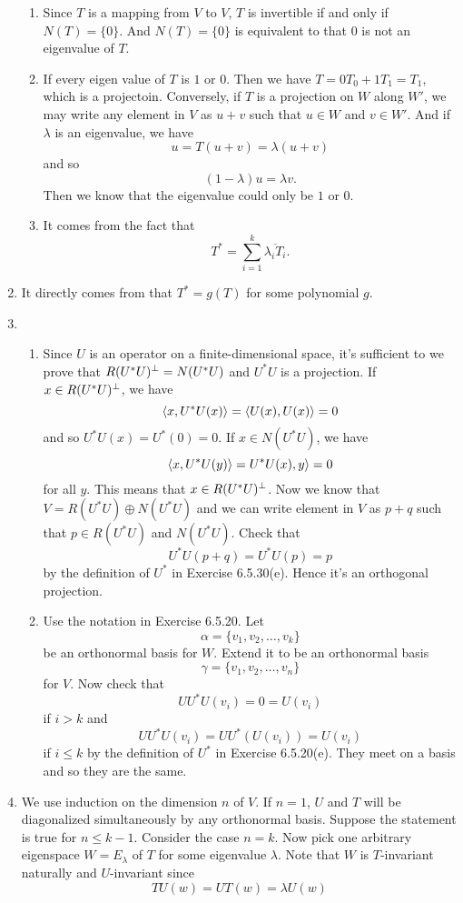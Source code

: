 \begin{enumerate}
\begin{enumerate}
\item Since $T$ is a mapping from $V$ to $V$, $T$ is invertible if and only if $N(T)=\{0\}$. And $N(T)=\{0\}$ is equivalent to that $0$ is not an eigenvalue of $T$.
\item If every eigen value of $T$ is $1$ or $0$. Then we have $T=0T_0+1T_1=T_1$, which is a projectoin. Conversely, if $T$ is a projection on $W$ along $W'$, we may write any element in $V$ as $u+v$ such that $u\in W$ and $v\in W'$. And if $\lambda $ is an eigenvalue, we have 
\[u=T(u+v)=\lambda(u+v)\]
and so 
\[(1-\lambda)u=\lambda v.\]
Then we know that the eigenvalue could only be $1$ or $0$.
\item It comes from the fact that 
\[T^*=\sum_{i=1}^k{\overline{\lambda_iT_i}}.\]
\end{enumerate}
\item It directly comes from that $T^*=g(T)$ for some polynomial $g$.
\item \begin{enumerate}
\item Since $U$ is an operator on a finite-dimensional space, it's sufficient to we prove that $R(U^*U)^{\perp} =N(U^*U)$ and $U^*U$ is a projection. If $x\in R(U^*U)^{\perp}$, we have 
\[\langle x,U^*U(x)\rangle =\langle U(x),U(x)\rangle =0\]
and so $U^*U(x)=U^*(0)=0$. If $x\in N(U^*U)$, we have 
\[\langle x,U^*U(y)\rangle =U^*U(x),y\rangle =0\]
for all $y$. This means that $x\in R(U^*U)^{\perp}$. Now we know that $V=R(U^*U)\oplus N(U^*U)$ and we can write element in $V$ as $p+q$ such that $p\in R(U^*U)$ and $N(U^*U)$. Check that 
\[U^*U(p+q)=U^*U(p)=p\]
by the definition of $U^*$ in Exercise 6.5.30(e). Hence it's an orthogonal projection.
\item Use the notation in Exercise 6.5.20. Let 
\[\alpha=\{v_1,v_2,\ldots ,v_k\}\]
be an orthonormal basis for $W$. Extend it to be an orthonormal basis 
\[\gamma=\{v_1,v_2,\ldots ,v_n\}\]
for $V$. Now check that 
\[UU^*U(v_i)=0=U(v_i)\]
if $i>k$ and 
\[UU^*U(v_i)=UU^*(U(v_i))=U(v_i)\]
if $i\leq k$ by the definition of $U^*$ in Exercise 6.5.20(e). They meet on a basis and so they are the same.
\end{enumerate}
\item We use induction on the dimension $n$ of $V$. If $n=1$, $U$ and $T$ will be diagonalized simultaneously by any orthonormal basis. Suppose the statement is true for $n\leq k-1$. Consider the case $n=k$. Now pick one arbitrary eigenspace $W=E_{\lambda}$ of $T$ for some eigenvalue $\lambda$. Note that $W$ is $T$-invariant naturally and $U$-invariant since 
\[TU(w)=UT(w)=\lambda U(w)\]

\end{enumerate}
